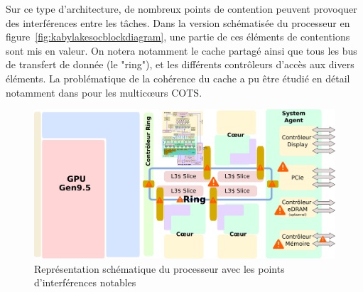 \documentclass[french, a4paper, 11pt, twoside, pdftex]{StyleThese}
\begin{document}
        	Sur ce type d'architecture, de nombreux points de contention peuvent provoquer des interférences entre les tâches. Dans la version schématisée du processeur en figure~\autoref{fig:kabylakesocblockdiagram}, une partie de ces éléments de contentions sont mis en valeur. On notera notamment le cache partagé ainsi que tous les bus de transfert de donnée (le "ring"), et les différents contrôleurs d'accès aux divers éléments. La problématique de la cohérence du cache a pu être étudié en détail notamment dans \cite{boniol_identification_2019} pour les multicœurs COTS.
        	
		\begin{figure}[ht!]
			\centering
			\includegraphics[width=\linewidth]{schemas/kaby_lake_soc_block_diagram}
			\captionsetup{justification=centering}
			\caption{Représentation schématique du processeur avec les points d'interférences notables}
			\label{fig:kabylakesocblockdiagram}
		\end{figure}
	
\end{document}
